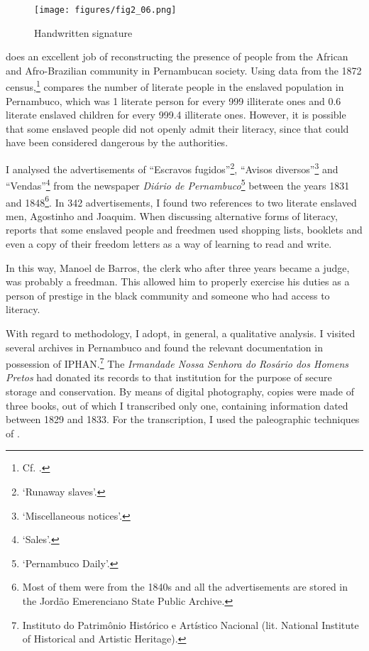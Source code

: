 \documentclass[output=paper,colorlinks,citecolor=brown]{langscibook}
\begin{document}
\begin{figure}[!ht]
    \centering
    \texttt{[image: figures/fig2\_06.png]}
    \caption{Handwritten signature}
    \label{fig:fig2_06}
\end{figure}

\citet{daSilva_2007} does an excellent job of reconstructing the presence of people from the African and Afro-Brazilian community in Pernambucan society. Using data from the 1872 census,\footnote{Cf. \citet{Brazil_1876}.} \citet{daSilva_2007} compares the number of literate people in the enslaved population in Pernambuco, which was 1 literate person for every 999 illiterate ones and 0.6 literate enslaved children for every 999.4 illiterate ones. However, it is possible that some enslaved people did not openly admit their literacy, since that could have been considered dangerous by the authorities.

I analysed the advertisements of “Escravos fugidos”\footnote{‘Runaway slaves’.}, “Avisos diversos”\footnote{‘Miscellaneous notices’.} and “Vendas”\footnote{‘Sales’.} from the newspaper \emph{Diário de Pernambuco}\footnote{‘Pernambuco Daily’.} between the years 1831 and 1848\footnote{Most of them were from the 1840s and all the advertisements are stored in the Jordão Emerenciano State Public Archive.}. In 342 advertisements, I found two references to two literate enslaved men, Agostinho and Joaquim. When discussing alternative forms of literacy, \citet{Moyses_1994} reports that some enslaved people and freedmen used shopping lists, booklets and even a copy of their freedom letters as a way of learning to read and write.

In this way, Manoel de Barros, the clerk who after three years became a judge, was probably a freedman. This allowed him to properly exercise his duties as a person of prestige in the black community and someone who had access to literacy.

With regard to methodology, I adopt, in general, a qualitative analysis. I visited several archives in Pernambuco and found the relevant documentation in possession of IPHAN.\footnote{Instituto do Patrimônio Histórico e Artístico Nacional (lit. National Institute of Historical and Artistic Heritage).} The \emph{Irmandade Nossa Senhora do Rosário dos Homens Pretos} had donated its records to that institution for the purpose of secure storage and conservation. By means of digital photography, copies were made of three books, out of which I transcribed only one, containing information dated between 1829 and 1833. For the transcription, I used the paleographic techniques of \citet{Barbosa_Acioli_Assis_2006}.
\end{document}
